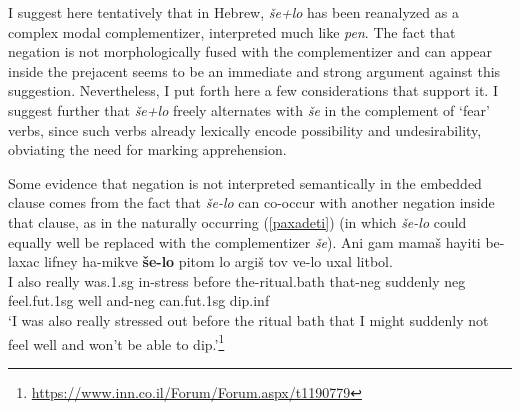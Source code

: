 \documentclass[output=paper,colorlinks,citecolor=brown]{langscibook}
\begin{document}
I suggest here tentatively that in Hebrew, \textit{še+lo} has been reanalyzed as a complex modal complementizer, interpreted much like \textit{pen}. The fact that negation is not morphologically fused with the complementizer and can appear inside the prejacent seems to be an immediate and strong argument against this suggestion. Nevertheless, I put forth here a few considerations that support it. I suggest further that \textit{še+lo} freely alternates with \textit{še} in the complement of `fear' verbs, since such verbs already lexically encode possibility and undesirability, obviating the need for marking apprehension.

Some evidence that negation is not interpreted semantically in the embedded clause comes from the fact that 
\textit{še-lo} can co-occur with another negation inside that clause, as in the naturally occurring (\ref{paxadeti}) (in which \textit{še-lo} could equally well be replaced with the complementizer \textit{še}).
\ea
\label{paxadeti}
\gll Ani gam mamaš hayiti be-laxac lifney ha-mikve \textbf{še-lo} pitom lo argiš tov ve-lo uxal litbol. \\
I also  really was.{\sc 1.sg} in-stress before the-{ritual.bath} that-{\sc neg} suddenly {\sc neg} feel.{\sc fut.1sg} well and-{\sc neg} can.{\sc fut.1sg} dip.{\sc inf} \\
\glt `I was also really stressed out before the ritual bath that I might suddenly not feel well and won't be able to dip.'\footnote{\url{https://www.inn.co.il/Forum/Forum.aspx/t1190779}}
\z
\end{document}
